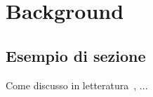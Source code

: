\chapter{Background}\label{background}


\section{Esempio di sezione}

Come discusso in letteratura~\cite{example-article, example-conference}, ...
